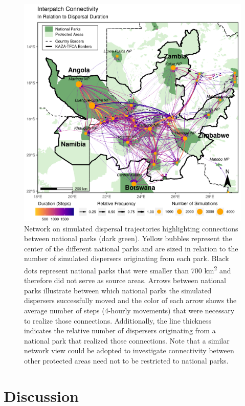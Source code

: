 \documentclass[abstract=on,10pt,a4paper,bibliography=totocnumbered]{article}
\begin{document}
\begin{figure}
  \includegraphics[width=\textwidth]{99_AreasReached.png}
  \caption{Network on simulated dispersal trajectories highlighting connections
  between national parks (dark green). Yellow bubbles represent the center of
  the different national parks and are sized in relation to the number of
  simulated dispersers originating from each park. Black dots represent national
  parks that were smaller than 700 km\textsuperscript{2} and therefore did not
  serve as source areas. Arrows between national parks illustrate between which
  national parks the simulated dispersers successfully moved and the color of
  each arrow shows the average number of steps (4-hourly movements) that were
  necessary to realize those connections. Additionally, the line thickness
  indicates the relative number of dispersers originating from a national park
  that realized those connections. Note that a similar network view could be
  adopted to investigate connectivity between other protected areas need not to
  be restricted to national parks.}
  \label{AreasReached}
\end{figure}

\section{Discussion} %
\end{document}
